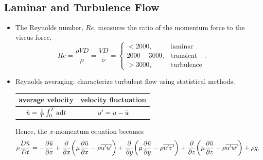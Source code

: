 \documentclass[a4paper]{article}
\begin{document}
\subsection{Laminar and Turbulence Flow}
\begin{itemize}
    \item The Reynolds number, $Re$, measures the ratio of the momentum force to the viscus force,
    \[ 
        Re = \frac{\rho VD}{\mu} = \frac{VD}{\nu}
        = \begin{cases}
            < 2000, & \text{laminar} \\
            2000 - 3000, & \text{transient} \\
            > 3000, & \text{turbulence}
        \end{cases}.
    \]

    \item Reynolds averaging: characterize turbulent flow using statistical methods.
    \begin{center}
        \begin{tabular}{c c}
        \toprule
        average velocity    &   velocity fluctuation\\
        \midrule
        $\Bar{u} = \frac{1}{T} \int_{0}^{T} u \mathrm{d}t$     & $u' = u - \Bar{u}$\\
        \bottomrule
        \end{tabular}
    \end{center}
    Hence, the $x$-momentum equation becomes
    \[
        \rho \frac{D\Bar{u}}{Dt} = -\frac{\partial \Bar{u}}{\partial x} + \frac{\partial}{\partial x} \bigg(\mu \frac{\partial\Bar{u}}{\partial x} - \rho \overline{u'u'}\bigg) + \frac{\partial}{\partial y} \bigg(\mu \frac{\partial\Bar{u}}{\partial y} - \rho \overline{u'v'}\bigg) + \frac{\partial}{\partial z} \bigg(\mu \frac{\partial\Bar{u}}{\partial z} - \rho \overline{u'w'}\bigg) + \rho g.
    \]
\end{itemize}
\end{document}
